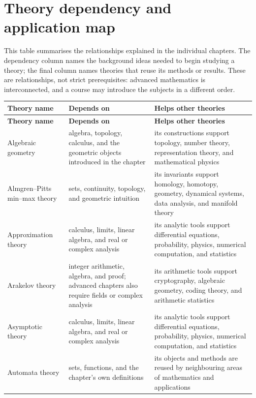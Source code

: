 \documentclass[11pt,oneside]{book}
\begin{document}
\backmatter
\appendix
\chapter{Theory dependency and application map}
This table summarises the relationships explained in the individual chapters. The dependency column names the background ideas needed to begin studying a theory; the final column names theories that reuse its methods or results. These are relationships, not strict prerequisites: advanced mathematics is interconnected, and a course may introduce the subjects in a different order.

\small
\sloppy
\setlength{\tabcolsep}{3pt}
\begin{longtable}{>{\raggedright\arraybackslash}p{}>{\raggedright\arraybackslash}p{}>{\raggedright\arraybackslash}p{}}
\textbf{Theory name} & \textbf{Depends on} & \textbf{Helps other theories}\\
\hline
\endfirsthead
\textbf{Theory name} & \textbf{Depends on} & \textbf{Helps other theories}\\
\hline
\endhead
Algebraic geometry & algebra, topology, calculus, and the geometric objects introduced in the chapter & its constructions support topology, number theory, representation theory, and mathematical physics\\
\hline
Almgren--Pitts min--max theory & sets, continuity, topology, and geometric intuition & its invariants support homology, homotopy, geometry, dynamical systems, data analysis, and manifold theory\\
\hline
Approximation theory & calculus, limits, linear algebra, and real or complex analysis & its analytic tools support differential equations, probability, physics, numerical computation, and statistics\\
\hline
Arakelov theory & integer arithmetic, algebra, and proof; advanced chapters also require fields or complex analysis & its arithmetic tools support cryptography, algebraic geometry, coding theory, and arithmetic statistics\\
\hline
Asymptotic theory & calculus, limits, linear algebra, and real or complex analysis & its analytic tools support differential equations, probability, physics, numerical computation, and statistics\\
\hline
Automata theory & sets, functions, and the chapter's own definitions & its objects and methods are reused by neighbouring areas of mathematics and applications\\

\end{longtable}
\end{document}
